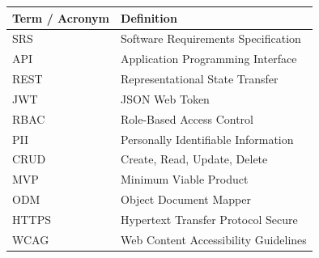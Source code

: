\documentclass[12pt]{article}
\begin{document}
\begin{longtable}{|p{3cm}|p{10cm}|}
\hline
\textbf{Term / Acronym} & \textbf{Definition} \\
\hline
SRS   & Software Requirements Specification \\
\hline
API   & Application Programming Interface \\
\hline
REST  & Representational State Transfer \\
\hline
JWT   & JSON Web Token \\
\hline
RBAC  & Role-Based Access Control \\
\hline
PII   & Personally Identifiable Information \\
\hline
CRUD  & Create, Read, Update, Delete \\
\hline
MVP   & Minimum Viable Product \\
\hline
ODM   & Object Document Mapper \\
\hline
HTTPS & Hypertext Transfer Protocol Secure \\
\hline
WCAG  & Web Content Accessibility Guidelines \\
\hline
\end{longtable}
\end{document}
